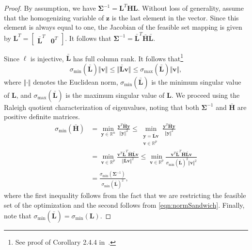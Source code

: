 \documentclass[lettersize,journal]{IEEEtran}
\begin{document}
\begin{proof}
By assumption, we have $\bm{\Sigma}^{-1} = \bm{L}^T\bm{H}\bm{L}$. Without loss of generality, assume that the homogenizing variable of $\bm{z}$ is the last element in the vector. Since this element is always equal to one, the Jacobian of the feasible set mapping is given by $\bm{L}^T = \begin{bmatrix}
	\bar{\bm{L}}^T & \bm{0}^T
\end{bmatrix}$. It follows that $\bm{\Sigma}^{-1} = \bar{\bm{L}}^T\bar{\bm{H}}\bar{\bm{L}}$.

Since $\bm{\ell}$ is injective, $\bar{\bm{L}}$ has full column rank. It follows that\footnote{See proof of Corollary 2.4.4 in~\cite{golubMatrixComputations2013}.}
\begin{equation}\label{eqn:normSandwich}
	\sigma_{\min}(\bar{\bm{L}}) \Vert\bm{v}\Vert \leq  \Vert\bar{\bm{L}}\bm{v}\Vert \leq \sigma_{\max}(\bar{\bm{L}})\Vert\bm{v}\Vert,
\end{equation}
where $\Vert\cdot\Vert$ denotes the Euclidean norm, $\sigma_{\min}(\bar{\bm{L}})$ is the minimum singular value of $\bm{L}$, and $\sigma_{\max}(\bar{\bm{L}})$ is the maximum singular value of $\bm{L}$. We proceed using the Raleigh quotient characterization of eigenvalues, noting that both $\bm{\Sigma}^{-1}$ and $\bar{\bm{H}}$ are positive definite matrices.
\begin{align*}
	\sigma_{\min}(\bar{\bm{H}}) &= \min\limits_{\bm{y}\in\mathbb{R}^n} \frac{\bm{y}^T \bar{\bm{H}} \bm{y}}{\Vert\bm{y}\Vert^2} 
	\leq \min\limits_{\substack{\bm{y}=\bar{\bm{L}}\bm{v}\\\bm{v}\in\mathbb{R}^p}} \frac{\bm{y}^T \bar{\bm{H}} \bm{y}}{\Vert\bm{y}\Vert^2} \\&= \min\limits_{\bm{v}\in\mathbb{R}^p} \frac{\bm{v}^T \bar{\bm{L}}^T\bar{\bm{H}}\bar{\bm{L}} \bm{v}}{\Vert\bar{\bm{L}}\bm{v}\Vert^2 }  
	\leq \min\limits_{\bm{v}\in\mathbb{R}^p} \frac{\bm{v}^T \bar{\bm{L}}^T\bar{\bm{H}}\bar{\bm{L}} \bm{v}}{\sigma_{\min}(\bar{\bm{L}})^2\Vert\bm{v}\Vert^2 } 
	\\&= \frac{\sigma_{\min}(\bm{\Sigma}^{-1})}{\sigma_{\min}(\bar{\bm{L}})^2},
\end{align*}
where the first inequality follows from the fact that we are restricting the feasible set of the optimization and the second follows from \eqref{eqn:normSandwich}. Finally, note that $\sigma_{\min}(\bar{\bm{L}}) = \sigma_{\min}(\bm{L})$.

\end{proof}
\end{document}
